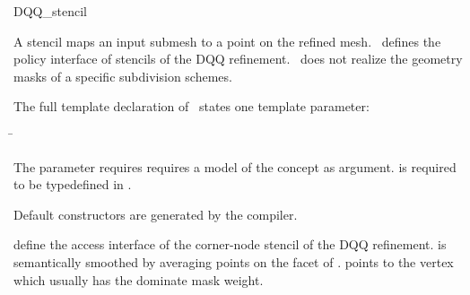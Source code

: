 \begin{ccRefClass}{DQQ_stencil}

\ccDefinition

A stencil maps an input submesh to a point on the refined 
mesh. \ccClassTemplateName\ defines the policy interface of 
stencils of the DQQ refinement. \ccClassTemplateName\ does not
realize the geometry masks of a specific subdivision schemes.


\ccParameters

The full template declaration of \ccClassTemplateName\ states one
template parameter:

\begin{tabbing}
 \=\\
\end{tabbing}
   
The  parameter requires requires a model of 
the  concept as argument.  
is required to be typedefined in .

\ccCreation

Default constructors are generated by the compiler.


\ccThree{}{}{}

{define the access interface of the corner-node stencil 
of the DQQ refinement. 
 is semantically smoothed by averaging points on 
the facet of .  points to the vertex 
which usually has the dominate mask weight.}

\ccSeeAlso

\\
\\
\\

\end{ccRefClass}

\ccRefPageEnd



